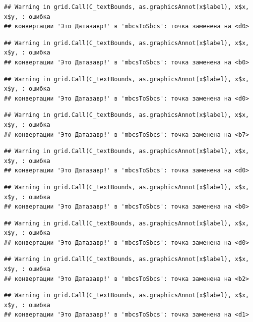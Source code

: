 \documentclass[]{book}
\begin{document}
\begin{verbatim}
## Warning in grid.Call(C_textBounds, as.graphicsAnnot(x$label), x$x, x$y, : ошибка
## конвертации 'Это Датазавр!' в 'mbcsToSbcs': точка заменена на <d0>
\end{verbatim}

\begin{verbatim}
## Warning in grid.Call(C_textBounds, as.graphicsAnnot(x$label), x$x, x$y, : ошибка
## конвертации 'Это Датазавр!' в 'mbcsToSbcs': точка заменена на <b0>
\end{verbatim}

\begin{verbatim}
## Warning in grid.Call(C_textBounds, as.graphicsAnnot(x$label), x$x, x$y, : ошибка
## конвертации 'Это Датазавр!' в 'mbcsToSbcs': точка заменена на <d0>
\end{verbatim}

\begin{verbatim}
## Warning in grid.Call(C_textBounds, as.graphicsAnnot(x$label), x$x, x$y, : ошибка
## конвертации 'Это Датазавр!' в 'mbcsToSbcs': точка заменена на <b7>
\end{verbatim}

\begin{verbatim}
## Warning in grid.Call(C_textBounds, as.graphicsAnnot(x$label), x$x, x$y, : ошибка
## конвертации 'Это Датазавр!' в 'mbcsToSbcs': точка заменена на <d0>
\end{verbatim}

\begin{verbatim}
## Warning in grid.Call(C_textBounds, as.graphicsAnnot(x$label), x$x, x$y, : ошибка
## конвертации 'Это Датазавр!' в 'mbcsToSbcs': точка заменена на <b0>
\end{verbatim}

\begin{verbatim}
## Warning in grid.Call(C_textBounds, as.graphicsAnnot(x$label), x$x, x$y, : ошибка
## конвертации 'Это Датазавр!' в 'mbcsToSbcs': точка заменена на <d0>
\end{verbatim}

\begin{verbatim}
## Warning in grid.Call(C_textBounds, as.graphicsAnnot(x$label), x$x, x$y, : ошибка
## конвертации 'Это Датазавр!' в 'mbcsToSbcs': точка заменена на <b2>
\end{verbatim}

\begin{verbatim}
## Warning in grid.Call(C_textBounds, as.graphicsAnnot(x$label), x$x, x$y, : ошибка
## конвертации 'Это Датазавр!' в 'mbcsToSbcs': точка заменена на <d1>
\end{verbatim}
\end{document}
